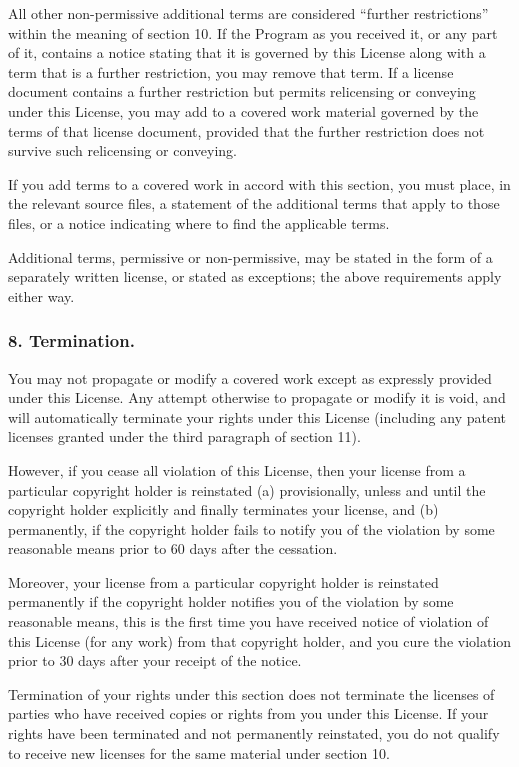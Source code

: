 All other non-permissive additional terms are considered “further restrictions” within the meaning of section 10. If the Program as you received it, or any part of it, contains a notice stating that it is governed by this License along with a term that is a further restriction, you may remove that term. If a license document contains a further restriction but permits relicensing or conveying under this License, you may add to a covered work material governed by the terms of that license document, provided that the further restriction does not survive such relicensing or conveying.\par
If you add terms to a covered work in accord with this section, you must place, in the relevant source files, a statement of the additional terms that apply to those files, or a notice indicating where to find the applicable terms.\par
Additional terms, permissive or non-permissive, may be stated in the form of a separately written license, or stated as exceptions; the above requirements apply either way.
\subsubsection{8. Termination.}
You may not propagate or modify a covered work except as expressly provided under this License. Any attempt otherwise to propagate or modify it is void, and will automatically terminate your rights under this License (including any patent licenses granted under the third paragraph of section 11).\par
However, if you cease all violation of this License, then your license from a particular copyright holder is reinstated (a) provisionally, unless and until the copyright holder explicitly and finally terminates your license, and (b) permanently, if the copyright holder fails to notify you of the violation by some reasonable means prior to 60 days after the cessation.\par
Moreover, your license from a particular copyright holder is reinstated permanently if the copyright holder notifies you of the violation by some reasonable means, this is the first time you have received notice of violation of this License (for any work) from that copyright holder, and you cure the violation prior to 30 days after your receipt of the notice.\par
Termination of your rights under this section does not terminate the licenses of parties who have received copies or rights from you under this License. If your rights have been terminated and not permanently reinstated, you do not qualify to receive new licenses for the same material under section 10.
